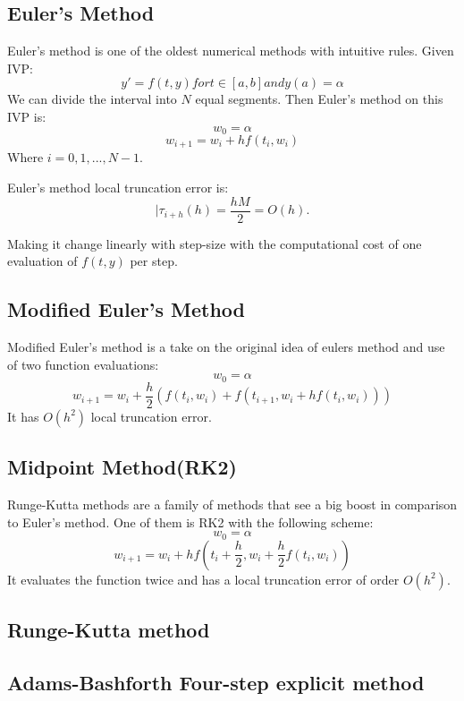 \documentclass[11pt]{article}	%
\begin{document}
\subsection{Euler's Method}
Euler's method is one of the oldest numerical methods with intuitive rules. Given IVP:
$$y\prime = f(t, y) for t \in [a, b] and y(a) = \alpha $$ 
We can divide the interval into $N$ equal segments. Then Euler's method on this IVP is: 
$$w_0 = \alpha $$
$$w_{i+1} = w_i + hf(t_i, w_i)$$
Where $i = 0,1,..., N-1$. 

Euler's method local truncation error is: 
$$|\tau _{i+h}(h) = \frac{hM}{2} = O(h).$$

Making it change linearly with step-size with the computational cost of one evaluation of $f(t, y)$ per step. 

\subsection{Modified Euler's Method}
Modified Euler's method is a take on the original idea of eulers method and use of two function evaluations:
$$w_0 = \alpha $$
$$w_{i+1} = w_i + \frac{h}{2}(f(t_i,w_i) + f(t_{i+1}, w_i + hf(t_i,w_i)))$$
It has $O(h^2)$ local truncation error. 

\subsection{Midpoint Method(RK2)}
Runge-Kutta methods are a family of methods that see a big boost in comparison to Euler's method. One of them is RK2 with the following scheme:
$$w_0 = \alpha $$
$$w_{i+1} = w_i + hf(t_i + \frac{h}{2}, w_i + \frac{h}{2}f(t_i, w_i))$$
It evaluates the function twice and has a local truncation error of order $O(h^2)$.

\subsection{Runge-Kutta method}

\subsection{Adams-Bashforth Four-step explicit method}
\end{document}
